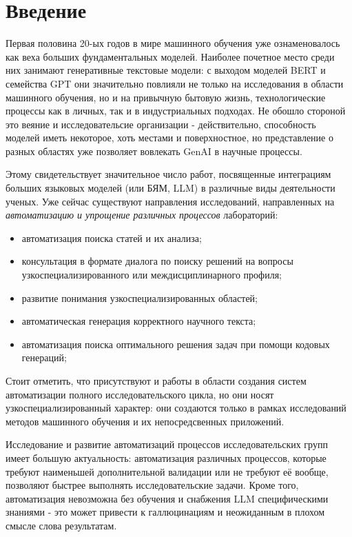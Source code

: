\chapter*{Введение} %

Первая половина 20-ых годов в мире машинного обучения уже ознаменовалось 
как веха больших фундаментальных моделей.
Наиболее почетное место среди них занимают генеративные текстовые модели: 
с выходом моделей BERT и семейства GPT они значительно повлияли не только на 
исследования в области машинного обучения, но и на привычную бытовую жизнь, 
технологические процессы как в личных, так и в индустриальных подходах. 
Не обошло стороной это веяние и исследовательсие организации - 
действительно, способность моделей иметь некоторое, хоть местами и поверхностное, 
но представление о разных областях уже позволяет вовлекать GenAI в научные процессы.

Этому свидетельствует значительное число работ, 
посвященные интеграциям больших языковых моделей (или БЯМ, LLM) 
в различные виды деятельности ученых. Уже сейчас существуют
направления исследований, направленных на \textit{автоматизацию и упрощение различных процессов}
лабораторий:
\begin{itemize}
	\item автоматизация поиска статей и их анализа;
	\item консультация в формате диалога по поиску решений на вопросы 
узкоспециализированного или междисциплинарного профиля;
	\item развитие понимания узкоспециализированных областей;
	\item автоматическая генерация корректного научного текста;
	\item автоматизация поиска оптимального решения задач при помощи кодовых генераций; 
\end{itemize}
Стоит отметить, что присутствуют и работы в области создания систем автоматизации полного 
исследовательского цикла, но они носят узкоспециализированный характер: они создаются только
в рамках исследований методов машинного обучения и их непосредсвенных приложений.

Исследование и развитие автоматизаций процессов исследовательских групп имеет 
большую актуальность: автоматизация различных процессов, которые требуют 
наименьшей дополнительной валидации или не требуют её вообще, позволяют быстрее 
выполнять исследовательские задачи. Кроме того, автоматизация невозможна без обучения
и снабжения LLM специфическими знаниями - это может привести к галлюцинациям и неожиданным
в плохом смысле слова результатам. 

